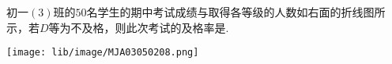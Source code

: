 初一$(3)$班的$50$名学生的期中考试成绩与取得各等级的人数如右面的折线图所示，若$D$等为不及格，则此次考试的及格率是\key{}.
\begin{center}
    \texttt{[image: lib/image/MJA03050208.png]}
\end{center}
